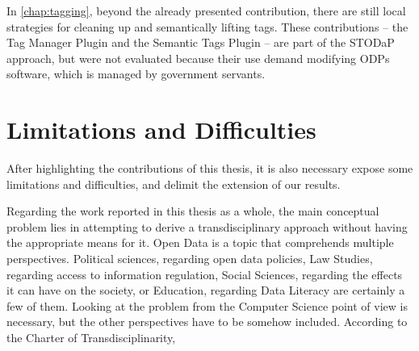 In \autoref{chap:tagging}, beyond the already presented contribution, there are still local strategies for cleaning up and semantically lifting tags.
These contributions -- the Tag Manager Plugin and the Semantic Tags Plugin -- are part of the STODaP approach, but were not evaluated because their use demand modifying ODPs software, which is managed by government servants.







\section{Limitations and Difficulties}

After highlighting the contributions of this thesis, it is also necessary expose some limitations and difficulties, and delimit the extension of our results.

Regarding the work reported in this thesis as a whole, the main conceptual problem lies in attempting to derive a transdisciplinary approach without having the appropriate means for it.
Open Data is a topic that comprehends multiple perspectives.
Political sciences, regarding open data policies, Law Studies, regarding access to information regulation, Social Sciences, regarding the effects it can have on the society, or Education, regarding Data Literacy are certainly a few of them.
Looking at the problem from the Computer Science point of view is necessary, but the other perspectives have to be somehow included.
According to the Charter of Transdisciplinarity, 


